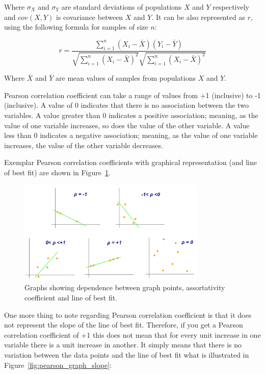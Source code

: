 Where $\sigma_X$ and $\sigma_Y$ are standard deviations of populations $X$ and $Y$ respectively and $cov(X,Y)$ is covariance between $X$ and $Y$.
It can be also represented as $r$, using the following formula for samples of size $n$:

$$r = \frac{\sum_{i=1}^{n} (X_i - \bar{X}) (Y_i - \bar{Y}) }
{ \sqrt{\sum_{i=1}^{n} (X_i - \bar{X})^2} \sqrt{\sum_{i=1}^{n} (X_i - \bar{X})^2} }$$

Where $\bar{X}$ and $\bar{Y}$ are mean values of samples from populations $X$ and $Y$.

Pearson correlation coefficient can take a range of values from +1 (inclusive) to -1 (inclusive).
A value of 0 indicates that there is no association between the two variables.
A value greater than 0 indicates a positive association; meaning, as the value of one variable increases, so does the value of the other variable.
A value less than 0 indicates a negative association; meaning, as the value of one variable increases, the value of the other variable decreases.

\clearpage
Exemplar Pearson correlation coefficients with graphical representation (and line of best fit) are shown in Figure~\ref{fig:pearson_graph}.

\begin{figure}[h!]
  \centering
  \captionsetup{justification=centering}
    \includegraphics[width=0.8\textwidth]{images/pearson_graphs.png}
  \caption{Graphs showing dependence between graph points, assortativity coefficient and line of best fit.\cite{wiki_pearson}}
  \label{fig:pearson_graph}
\end{figure}

One more thing to note regarding Pearson correlation coefficient is that it does not represent the slope of the line of best fit.
Therefore, if you get a Pearson correlation coefficient of +1 this does not mean that for every unit increase in one variable there is a unit increase in another.
It simply means that there is no variation between the data points and the line of best fit what is illustrated in Figure~\ref{fig:pearson_graph_slope}:

